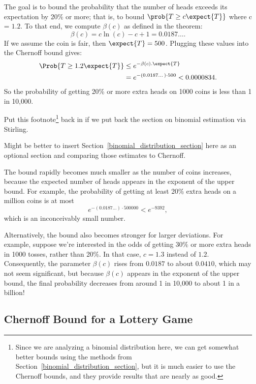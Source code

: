 The goal is to bound the probability that the number of heads exceeds
its expectation by 20\% or more; that is, to bound $\prob{T \geq c
  \expect{T}}$ where c = $1.2$.  To that end, we compute $\beta(c)$ as
defined in the theorem:
\[
\beta(c) = c \ln(c) - c + 1 = 0.0187\dots.
\]
If we assume the coin is fair, then $\expect{T} = 500$.
Plugging these values into the Chernoff bound gives:
\begin{align*}
\Prob{T \geq 1.2 \expect{T}} & \leq  e^{- \beta(c). \expect{T}} \\
  & = e^{- (0.0187\dots) \cdot 500} <  0.0000834.
\end{align*}
So the probability of getting 20\% or more extra heads on 1000 coins
is less than 1 in 10,000.

\begin{editingnotes}
Put this footnote\footnote{Since we are analyzing a binomial
  distribution here, we can get somewhat better bounds using the
  methods from Section~\ref{binomial_distribution_section}, but it is
  much easier to use the Chernoff bounds, and they provide results
  that are nearly as good.} back in if we put back the section on binomial estimation
via Stirling.

Might be better to insert Section~\ref{binomial_distribution_section}
here as an optional section and comparing those estimates to
Chernoff.
\end{editingnotes}

The bound rapidly becomes much smaller as the number of coins
increases, because the expected number of heads appears in the
exponent of the upper bound.  For example, the probability of getting
at least 20\% extra heads on a million coins is at most
\[
e^{- (0.0187\dots) \cdot 500000} < e^{-9392},
\]
which is an inconceivably small number.  %

Alternatively, the bound also becomes stronger for larger deviations.
For example, suppose we're interested in the odds of getting 30\% or
more extra heads in 1000 tosses, rather than 20\%.  In that case,
$c= 1.3$ instead of $1.2$.  Consequently, the parameter $\beta(c)$ rises from
$0.0187$ to about $0.0410$, which may not seem significant, but because
$\beta(c)$ appears in the exponent of the upper bound, the final probability
decreases from around 1 in 10,000 to about 1 in a billion!

\subsection{Chernoff Bound for a Lottery Game}

